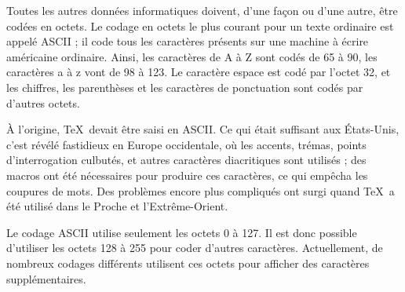 \documentclass[11pt,french]{article}
\newcommand{\acr}[1]{\textsf{#1}}
\begin{document}
Toutes les autres données informatiques doivent, d'une façon ou d'une autre, être codées en octets. Le codage en octets le plus courant pour un texte ordinaire est appelé \acr{ASCII} ; il code tous les caractères présents sur une machine à écrire américaine ordinaire. Ainsi, les caractères de A à Z sont codés de 65 à 90, les caractères a à z vont de 98 à 123. Le caractère espace est codé par l'octet 32, et les chiffres, les parenthèses et les caractères de ponctuation sont codés par d'autres octets.

À l'origine, \TeX\ devait être saisi en \acr{ASCII}. Ce qui était suffisant aux États-Unis, c'est révélé fastidieux en Europe occidentale, où les accents, trémas, points d'interrogation culbutés, et autres caractères diacritiques sont utilisés ; des macros ont été nécessaires pour produire ces caractères, ce qui empêcha les coupures de mots. Des problèmes encore plus compliqués ont surgi quand \TeX\ a été utilisé dans le Proche et l'Extrême-Orient.

Le codage \acr{ASCII} utilise seulement les octets 0 à 127. Il est donc possible d'utiliser les octets 128 à 255 pour coder d'autres caractères. Actuellement, de nombreux codages différents utilisent ces octets pour afficher des caractères supplémentaires.

\end{document}
